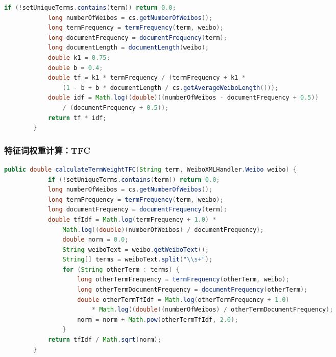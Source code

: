 \documentclass[CJKutf8, table]{beamer}
\begin{document}
\begin{CJK}{UTF8}{gbsn}
\begin{frame}[fragile]
\begin{tiny}
\begin{block}{}
\begin{lstlisting}[language=Java]
            if (!setUniqueTerms.contains(term)) return 0.0;
            long numberOfWeibos = cs.getNumberOfWeibos();
            long termFrequency = termFrequency(term, weibo);
            long documentFrequency = documentFrequency(term);
            long documentLength = documentLength(weibo);
            double k1 = 0.75;
            double b = 0.4;
            double tf = k1 * termFrequency / (termFrequency + k1 * 
                (1 - b + b * documentLength / cs.getAverageWeiboLength()));
            double idf = Math.log((double)((numberOfWeibos - documentFrequency + 0.5))
                / (documentFrequency + 0.5));
            return tf * idf;
        }
	      \end{lstlisting}
    \end{block}
  \end{tiny}
\end{frame}

\begin{frame}[fragile]
  \frametitle{特征词权重计算：TFC}
  \lstset{language=Java,basicstyle=\ttfamily,commentstyle=\ttfamily}
  \begin{tiny}
    \begin{block}{}
      \begin{lstlisting}[language=Java]
        public double calculateTermWeightTFC(String term, WeiboXMLHandler.Weibo weibo) {
            if (!setUniqueTerms.contains(term)) return 0.0;
            long numberOfWeibos = cs.getNumberOfWeibos();
            long termFrequency = termFrequency(term, weibo);
            long documentFrequency = documentFrequency(term);
            double tfIdf = Math.log(termFrequency + 1.0) * 
                Math.log((double)(numberOfWeibos) / documentFrequency);
                double norm = 0.0;
                String weiboText = weibo.getWeiboText();
                String[] terms = weiboText.split("\\s+");
                for (String otherTerm : terms) {
                    long otherTermFrequency = termFrequency(otherTerm, weibo);
                    long otherTermDocumentFrequency = documentFrequency(otherTerm);
                    double otherTermTfIdf = Math.log(otherTermFrequency + 1.0) 
                        * Math.log((double)(numberOfWeibos) / otherTermDocumentFrequency);
                    norm = norm + Math.pow(otherTermTfIdf, 2.0);
                }
            return tfIdf / Math.sqrt(norm);
        }	    
      \end{lstlisting}
    \end{block}
  \end{tiny}
\end{frame}


\end{CJK}
\end{document}
